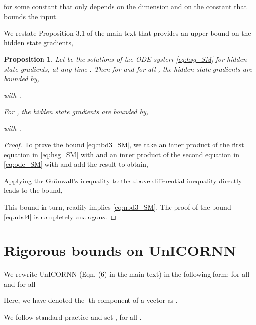 \documentclass[a4paper]{article}
\newtheorem{proposition}[theorem]{Proposition}
\begin{document}
for some constant  that only depends on the dimension  and on the constant  that bounds the input.



We restate Proposition 3.1 of the main text that provides an upper bound on the hidden state gradients,
\begin{proposition}
\label{prop:n2_SM}
Let  be the solutions of the ODE system \eqref{eq:hsg_SM} for hidden state gradients, at any time . Then for  and for all , the hidden state gradients are bounded by,

with .

For , the hidden state gradients are bounded by,

with .
\end{proposition}
\begin{proof}
To prove the bound \eqref{eq:nbd3_SM}, we take an inner product of the first equation in \eqref{eq:hsg_SM} with  and an inner product of the second equation in \eqref{eq:ode_SM} with  and add the result to obtain,

Applying the Gr\"onwall's inequality to the above differential inequality directly leads to the bound,

This bound in turn, readily implies \eqref{eq:nbd3_SM}. The proof of the bound \eqref{eq:nbd4} is completely analogous. 
\end{proof}
\section{Rigorous bounds on UnICORNN}
We rewrite UnICORNN (Eqn. (6) in the main text) in the following form: for all  and for all 

Here, we have denoted the -th component of a vector  as .

We follow standard practice and set , for all . 
\end{document}
